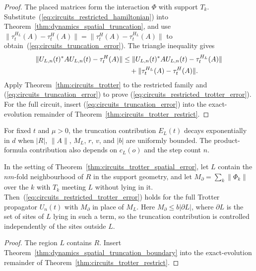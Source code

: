 \begin{proof}\leanok
    The placed matrices form the interaction $\Phi$ with support $T_k$.
    Substitute~(\ref{eq:circuits_restricted_hamiltonian}) into
    Theorem~\ref{thm:dynamics_spatial_truncation}, and use
    $\|\tau^{H_L}_t(A)-\tau^H_t(A)\|=\|\tau^H_t(A)-\tau^{H_L}_t(A)\|$
    to obtain~(\ref{eq:circuits_truncation_error}). The triangle inequality gives
    \begin{align}
        \|U_{L,n}(t)^*AU_{L,n}(t)-\tau^H_t(A)\|
        &\leq\|U_{L,n}(t)^*AU_{L,n}(t)-\tau^{H_L}_t(A)\|\notag\\
        &\quad+\|\tau^{H_L}_t(A)-\tau^H_t(A)\|.\notag
    \end{align}
    Apply Theorem~\ref{thm:circuits_trotter} to the restricted family and
    (\ref{eq:circuits_truncation_error}) to prove
    (\ref{eq:circuits_restricted_trotter_error}). For the full circuit, insert
    (\ref{eq:circuits_truncation_error}) into the exact-evolution remainder of
    Theorem~\ref{thm:circuits_trotter_restrict}.
\end{proof}

For fixed $t$ and $\mu>0$, the truncation contribution $E_L(t)$ decays exponentially
in $d$ when $|R|$, $\|A\|$, $M_L$, $r$, $v$, and $|b|$ are uniformly bounded.
The product-formula contribution also depends on $c_L(o)$ and the step count $n$.

\begin{theorem}
    \label{thm:circuits_trotter_spatial_error_boundary}
    \leanok
    In the setting of Theorem~\ref{thm:circuits_trotter_spatial_error}, let $L$ contain the
    $nm$-fold neighbourhood of $R$ in the support geometry, and let
    $M_\partial=\sum_k\|\Phi_k\|$ over the $k$ with $T_k$ meeting $L$ without lying in it.
    Then~(\ref{eq:circuits_restricted_trotter_error}) holds for the full Trotter propagator
    $U_n(t)$ with $M_\partial$ in place of $M_L$. Here $M_\partial\leq b|\partial L|$, where
    $\partial L$ is the set of sites of $L$ lying in such a term, so the truncation
    contribution is controlled independently of the sites outside $L$.
\end{theorem}
\begin{proof}\leanok
    The region $L$ contains $R$. Insert
    Theorem~\ref{thm:dynamics_spatial_truncation_boundary} into the exact-evolution remainder
    of Theorem~\ref{thm:circuits_trotter_restrict}.
\end{proof}
